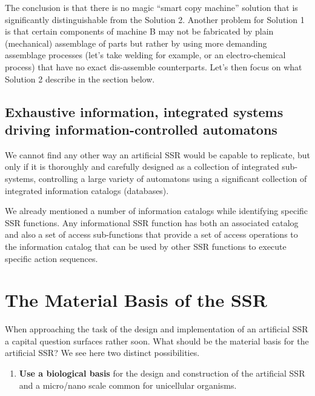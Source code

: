 The conclusion is that there is no magic “smart copy machine” solution
that is significantly distinguishable from the Solution 2. Another
problem for Solution 1 is that certain components of machine B may not
be fabricated by plain (mechanical) assemblage of parts but rather by
using more demanding assemblage processes (let’s take welding for
example, or an electro-chemical process) that have no exact
dis-assemble counterparts. Let’s then focus on what Solution 2 describe
in the section below.

\subsection[Exhaustive information, integrated systems driving
information{}-controlled automatons]{Exhaustive information, integrated
systems driving information-controlled automatons}

\hypertarget{RefHeading3122306210128}{}\label{bkm:Ref348984751}We cannot
find any other way an artificial SSR would be capable to replicate, but
only if it is thoroughly and carefully designed as a collection of
integrated sub-systems, controlling a large variety of automatons using
a significant collection of integrated information catalogs
(databases).

We already mentioned a number of information catalogs while identifying
specific SSR functions. Any informational SSR function has both an
associated catalog and also a set of access sub-functions that provide
a set of access operations to the information catalog that can be used
by other SSR functions to execute specific action sequences.

\section{The Material Basis of the SSR}

When approaching the task of the design and implementation of an
artificial SSR a capital question surfaces rather soon. What should be
the material basis for the artificial SSR? We see here two distinct
possibilities.


\begin{enumerate}
\item \textbf{Use a biological basis} for the design and construction of
the artificial SSR and a micro/nano scale common for unicellular
organisms. 
\end{enumerate}

